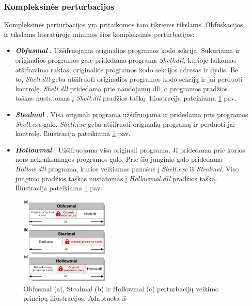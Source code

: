 \clearpage
\subsubsection{Kompleksinės perturbacijos}\label{sec:literature:perturbations:complex}
Kompleksinės perturbacijos yra pritaikomos tam tikriems tikslams. Obfuskacijos ir  tikslams literatūroje minimos šios kompleksinės perturbacijos:
\begin{itemize}
    \item \textbf{\textit{Obfusmal}} \cite{zhongMalFoxCamouflagedAdversarial2024}. Užšifruojama originalios programos kodo sekcija. Sukuriama ir originalios programos gale pridedama programa \textit{Shell.dll}, kurioje laikomas atšifravimo raktas, originalios programos kodo sekcijos adresas ir dydis. Be to, \textit{Shell.dll} geba atšifruoti originalios programos kodo sekciją ir jai perduoti kontrolę. \textit{Shell.dll} pridedama prie naudojamų \gls{dll}, o programos pradžios taškas nustatomas į \textit{Shell.dll} pradžios tašką. Iliustracija pateikiama \ref{fig:perturbations} pav.
    \item \textbf{\textit{Stealmal}} \cite{zhongMalFoxCamouflagedAdversarial2024}. Visa originali programa užšifruojama ir pridedama prie programos \textit{Shell.exe} galo. \textit{Shell.exe} geba atšifruoti originalią programą ir perduoti jai kontrolę. Iliustracija pateikiama \ref{fig:perturbations} pav.
    \item \textbf{\textit{Hollowmal}} \cite{zhongMalFoxCamouflagedAdversarial2024}. Užšifruojama visa originali programa. Ji pridedama prie kurios nors nekenksmingos programos galo. Prie šio junginio galo pridedama \textit{Hollow.dll} programa, kurios veikiamas panašus į \textit{Shell.exe} iš \textit{Stealmal}. Viso junginio pradžios taškas nustatomas į \textit{Hollowmal.dll} pradžios tašką. Iliustracija pateikiama \ref{fig:perturbations} pav.
\end{itemize}

\begin{figure}[h]
    \begin{small}
        \begin{center}
            \includegraphics[width=0.4\textwidth]{images/complex-perturbations.png}
        \end{center}
        \caption{Obfusmal (a), Stealmal (b) ir Hollowmal (c) perturbacijų veikimo principų iliustracijos. Adaptuota iš \cite{zhongReinforcementLearningBased2022}}\label{fig:perturbations}
    \end{small}
\end{figure}
\clearpage